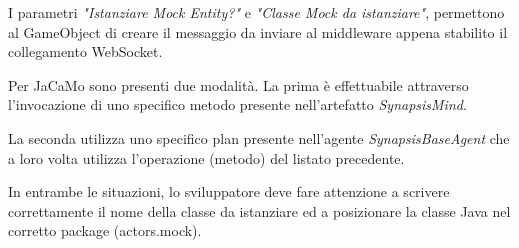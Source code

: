 I parametri \textit{"Istanziare Mock Entity?"} e \textit{"Classe Mock da istanziare"}, permettono al GameObject di creare il messaggio da inviare al middleware appena stabilito il collegamento WebSocket.

\medskip

Per JaCaMo sono presenti due modalità. La prima è effettuabile attraverso l'invocazione di uno specifico metodo presente nell'artefatto \textit{SynapsisMind}.



La seconda utilizza uno specifico plan presente nell'agente \textit{SynapsisBaseAgent} che a loro volta utilizza l'operazione (metodo) del listato precedente.



In entrambe le situazioni, lo sviluppatore deve fare attenzione a scrivere correttamente il nome della classe da istanziare ed a posizionare la classe Java nel corretto package (actors.mock).


